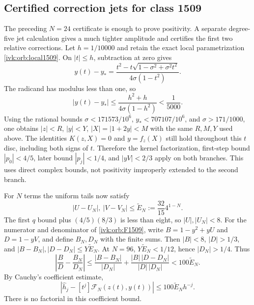\documentclass[11pt,letterpaper]{article}
\theoremstyle{remark}\newtheorem{remark}[theorem]{Remark}
\begin{document}
\subsection{Certified correction jets for class 1509}
The preceding $N=24$ certificate is enough to prove positivity.
A separate degree-five jet calculation gives a much tighter amplitude
and certifies the first two relative corrections. Let
$h=1/10000$ and retain the exact local parametrization
\eqref{ivk:orb:local1509}. On $|t|\le h$, subtraction at zero gives
\[
y(t)-y_*=
\frac{t^2-t\sqrt{1-\sigma^2+\sigma^2t^2}}{4\sigma(1-t^2)}.
\]
The radicand has modulus less than one, so
\begin{equation}\label{ivk:orb:localbox1509}
|y(t)-y_*|\le\frac{h^2+h}{4\sigma(1-h^2)}<\frac1{5000}.
\end{equation}
Using the rational bounds
$\sigma<171573/10^6$, $y_*<707107/10^6$, and $\sigma>171/1000$,
one obtains $|z|<R$, $|y|<Y$, $|X|=|1+2y|<M$ with the same
$R,M,Y$ used above. The identities $K(z,X)=0$ and $y=f_z(X)$
still hold throughout this $t$ disc, including both signs of $t$.
Therefore the kernel factorization, first-step bound $|p_0|<4/5$,
later bound $|p_j|<1/4$, and $|yV|<2/3$ apply on both branches.
This uses direct complex bounds, not positivity improperly extended
to the second branch.

For $N$ terms the uniform tails now satisfy
\[
|U-U_N|,\ |V-V_N|\le \widetilde E_N
:=\frac{32}{15}4^{1-N}.
\]
The first $q$ bound plus $(4/5)(8/3)$ is less than eight, so
$|U|,|U_N|<8$. For the numerator and denominator of
\eqref{ivk:orb:F1509}, write $B=1-y^2+yU$ and $D=1-yV$, and define
$B_N,D_N$ with the finite sums. Then $|B|<8$, $|D|>1/3$, and
$|B-B_N|,|D-D_N|\le Y\widetilde E_N$.
At $N=96$, $Y\widetilde E_N<1/12$, hence $|D_N|>1/4$. Thus
\begin{equation}\label{ivk:orb:quotienttail1509}
\left|\frac BD-\frac{B_N}{D_N}\right|
\le\frac{|B-B_N|}{|D_N|}
+\frac{|B|\,|D-D_N|}{|D|\,|D_N|}
<100\widetilde E_N.
\end{equation}
By Cauchy's coefficient estimate,
\begin{equation}\label{ivk:orb:jettail1509}
\left|\widehat h_j-[t^j]\mathcal F_N(z(t),y(t))\right|
\le100\widetilde E_N h^{-j}.
\end{equation}
There is no factorial in this coefficient bound.
\end{document}
